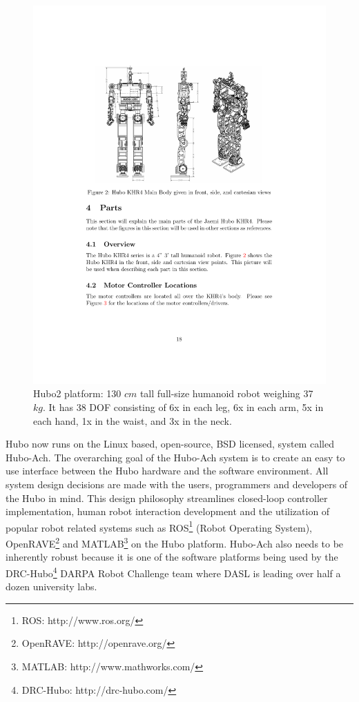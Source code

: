 \begin{figure}[thpb]
  \centering
\includegraphics[width=1.0\columnwidth]{./pix/huboSkel.pdf}
  \caption{Hubo2 platform: 130 $cm$ tall full-size humanoid robot weighing 37 $kg$.  It has 38 DOF consisting of 6x in each leg, 6x in each arm, 5x in each hand, 1x in the waist, and 3x in the neck.}
  \label{fig:hubo}
\end{figure}

Hubo now runs on the Linux based, open-source, BSD licensed, system called Hubo-Ach.  
The overarching goal of the Hubo-Ach system is to create an easy to use interface between the Hubo hardware and the software environment.  
All system design decisions are made with the users, programmers and developers of the Hubo in mind.
This design philosophy streamlines closed-loop controller implementation, human robot interaction development and the utilization of popular robot related systems such as ROS\footnote{ROS: http://www.ros.org/} (Robot Operating System), OpenRAVE\footnote{OpenRAVE: http://openrave.org/} and MATLAB\footnote{MATLAB: http://www.mathworks.com/} on the Hubo platform.
Hubo-Ach also needs to be inherently robust because it is one of the software platforms being used by the DRC-Hubo\footnote{DRC-Hubo: http://drc-hubo.com/} DARPA Robot Challenge team where DASL is leading over half a dozen university labs.


